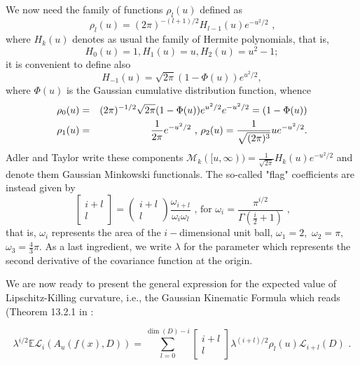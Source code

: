 \documentclass[aps,prd,showpacs,superscriptaddress,groupedaddress]{revtex4-1}  %
\begin{document}
We now need the family of functions $\rho _{l}(u)$ defined as
\begin{equation}
\rho _{l}(u)=(2\pi )^{-(l+1)/2}H_{l-1}(u)e^{-u^{2}/2}\text{ ,}
\end{equation} where $H_{k}(u)$ denotes as usual the family of Hermite polynomials, that is,
\begin{equation}
H_{0}(u)=1, H_{1}(u)=u, H_{2}(u)=u^{2}-1;
\end{equation}
it is convenient to define also
\begin{equation}
H_{-1}(u)=\sqrt{2\pi }(1-\Phi (u))e^{u^{2}/2},
\end{equation}
where $\Phi (u)$ is the Gaussian cumulative distribution function, whence%
\begin{eqnarray}
\rho _{0}(u) &=&(2\pi )^{-1/2}\sqrt{2\pi }(1-\Phi
(u))e^{u^{2}/2}e^{-u^{2}/2}=(1-\Phi (u)) \\
\rho _{1}(u) &=&\frac{1}{2\pi }e^{-u^{2}/2}\text{ , }\rho _{2}(u)=\frac{1}{%
\sqrt{(2\pi )^{3}}}ue^{-u^{2}/2}.
\end{eqnarray}%
Adler and Taylor \cite{TaylorAdler2009} write these components $\mathcal{M}_{k}([u,\infty ))=\frac{1}{\sqrt{2\pi }}%
H_{k}(u)e^{-u^{2}/2}$ and denote them Gaussian Minkowski functionals. The so-called "flag" coefficients are instead given by
\begin{equation}
\left[
\begin{array}{c}
i+l \\
l%
\end{array}%
\right] =\left(
\begin{array}{c}
i+l \\
l%
\end{array}%
\right) \frac{\omega _{i+l}}{\omega _{i}\omega _{l}}\text{ , for }\omega
_{i}=\frac{\pi ^{i/2}}{\Gamma (\frac{i}{2}+1)}\text{ ,}
\end{equation}%
that is, $\omega _{i}$ represents the area of the $i-$dimensional unit ball, $%
\omega _{1}=2,$ $\omega _{2}=\pi ,$ $\omega _{3}=\frac{4}{3}\pi.$
As a last ingredient, we write $\lambda$ for the parameter which represents the second derivative of
the covariance function at the origin.

We are now ready to present the general expression for the expected value of Lipschitz-Killing curvature, i.e., the Gaussian Kinematic Formula which reads (Theorem 13.2.1 in \cite{RFG}:

\begin{equation}
\lambda ^{i/2}\mathbb{E}\mathcal{L}_{i}(A_{u}(f(x),D))=\sum_{l=0}^{\dim
(D)-i}\left[
\begin{array}{c}
i+l \\
l%
\end{array}%
\right] \lambda ^{(i+l)/2}\rho _{l}(u)\mathcal{L}_{i+l}(D)\text{ .}
\label{GKF}
\end{equation}
\end{document}
